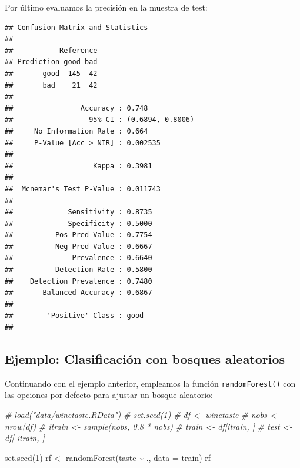 \documentclass[
  spanish,
]{book}
\newenvironment{Shaded}{\begin{snugshade}}{\end{snugshade}}
\newcommand{\AttributeTok}[1]{\textcolor[rgb]{0.77,0.63,0.00}{#1}}
\newcommand{\CommentTok}[1]{\textcolor[rgb]{0.56,0.35,0.01}{\textit{#1}}}
\newcommand{\DecValTok}[1]{\textcolor[rgb]{0.00,0.00,0.81}{#1}}
\newcommand{\FunctionTok}[1]{\textcolor[rgb]{0.00,0.00,0.00}{#1}}
\newcommand{\NormalTok}[1]{#1}
\newcommand{\OtherTok}[1]{\textcolor[rgb]{0.56,0.35,0.01}{#1}}
\newcommand{\SpecialCharTok}[1]{\textcolor[rgb]{0.00,0.00,0.00}{#1}}
\theoremstyle{break}
\theoremstyle{definition}
\theoremstyle{definition}
\theoremstyle{definition}
\theoremstyle{definition}
\theoremstyle{remark}
\begin{document}
Por último evaluamos la precisión en la muestra de test:

\begin{Shaded}
\end{Shaded}

\begin{verbatim}
## Confusion Matrix and Statistics
## 
##           Reference
## Prediction good bad
##       good  145  42
##       bad    21  42
##                                           
##                Accuracy : 0.748           
##                  95% CI : (0.6894, 0.8006)
##     No Information Rate : 0.664           
##     P-Value [Acc > NIR] : 0.002535        
##                                           
##                   Kappa : 0.3981          
##                                           
##  Mcnemar's Test P-Value : 0.011743        
##                                           
##             Sensitivity : 0.8735          
##             Specificity : 0.5000          
##          Pos Pred Value : 0.7754          
##          Neg Pred Value : 0.6667          
##              Prevalence : 0.6640          
##          Detection Rate : 0.5800          
##    Detection Prevalence : 0.7480          
##       Balanced Accuracy : 0.6867          
##                                           
##        'Positive' Class : good            
## 
\end{verbatim}

\hypertarget{ejemplo-clasif-rf}{%
\subsection{Ejemplo: Clasificación con bosques aleatorios}\label{ejemplo-clasif-rf}}

Continuando con el ejemplo anterior, empleamos la función \texttt{randomForest()} con las opciones por defecto para ajustar un bosque aleatorio:

\begin{Shaded}
\begin{Highlighting}[]
\CommentTok{\# load("data/winetaste.RData")}
\CommentTok{\# set.seed(1)}
\CommentTok{\# df \textless{}{-} winetaste}
\CommentTok{\# nobs \textless{}{-} nrow(df)}
\CommentTok{\# itrain \textless{}{-} sample(nobs, 0.8 * nobs)}
\CommentTok{\# train \textless{}{-} df[itrain, ]}
\CommentTok{\# test \textless{}{-} df[{-}itrain, ]}

\FunctionTok{set.seed}\NormalTok{(}\DecValTok{1}\NormalTok{)}
\NormalTok{rf }\OtherTok{\textless{}{-}} \FunctionTok{randomForest}\NormalTok{(taste }\SpecialCharTok{\textasciitilde{}}\NormalTok{ ., }\AttributeTok{data =}\NormalTok{ train)}
\NormalTok{rf}
\end{Highlighting}
\end{Shaded}
\end{document}
